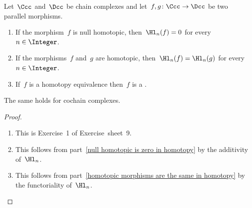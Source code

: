 \begin{lemma}
  Let~$\Ccc$ and~$\Dcc$ be chain complexes and let~$f, g \colon \Ccc \to \Dcc$ be two parallel morphisms.
  \begin{enumerate}
    \item
      \label{null homotopic is zero in homotopy}
      If the morphism~$f$ is null homotopic, then~$\Hl_n(f) = 0$ for every~$n \in \Integer$.
    \item
      \label{homotopic morphisms are the same in homotopy}
      If the morphisms~$f$ and~$g$ are homotopic, then~$\Hl_n(f) = \Hl_n(g)$ for every~$n \in \Integer$.
    \item
      If~$f$ is a homotopy equivalence then~$f$ is a {\qim}.
  \end{enumerate}
  The same holds for cochain complexes.
\end{lemma}


\begin{proof}
  \leavevmode
  \begin{enumerate}
    \item
      This is Exercise~1 of Exercise~sheet~9.
    \item
      This follows from part~\ref*{null homotopic is zero in homotopy} by the additivity of~$\Hl_n$.
    \item
      This follows from part~\ref*{homotopic morphisms are the same in homotopy} by the functoriality of~$\Hl_n$.
    \qedhere
  \end{enumerate}
\end{proof}


